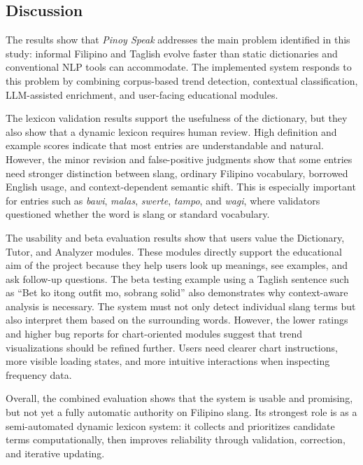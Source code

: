 \subsection{Discussion}
The results show that \textit{Pinoy Speak} addresses the main problem identified in this study: informal Filipino and Taglish evolve faster than static dictionaries and conventional NLP tools can accommodate. The implemented system responds to this problem by combining corpus-based trend detection, contextual classification, LLM-assisted enrichment, and user-facing educational modules.

The lexicon validation results support the usefulness of the dictionary, but they also show that a dynamic lexicon requires human review. High definition and example scores indicate that most entries are understandable and natural. However, the minor revision and false-positive judgments show that some entries need stronger distinction between slang, ordinary Filipino vocabulary, borrowed English usage, and context-dependent semantic shift. This is especially important for entries such as \textit{bawi}, \textit{malas}, \textit{swerte}, \textit{tampo}, and \textit{wagi}, where validators questioned whether the word is slang or standard vocabulary.

The usability and beta evaluation results show that users value the Dictionary, Tutor, and Analyzer modules. These modules directly support the educational aim of the project because they help users look up meanings, see examples, and ask follow-up questions. The beta testing example using a Taglish sentence such as ``Bet ko itong outfit mo, sobrang solid'' also demonstrates why context-aware analysis is necessary. The system must not only detect individual slang terms but also interpret them based on the surrounding words. However, the lower ratings and higher bug reports for chart-oriented modules suggest that trend visualizations should be refined further. Users need clearer chart instructions, more visible loading states, and more intuitive interactions when inspecting frequency data.

Overall, the combined evaluation shows that the system is usable and promising, but not yet a fully automatic authority on Filipino slang. Its strongest role is as a semi-automated dynamic lexicon system: it collects and prioritizes candidate terms computationally, then improves reliability through validation, correction, and iterative updating.

